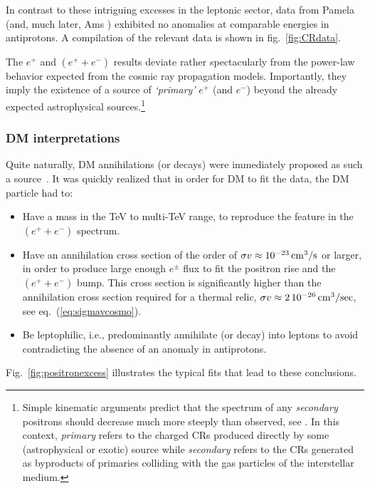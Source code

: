 In contrast to these intriguing excesses in the leptonic sector, data from {\sc Pamela} \cite{PAMELApbar} (and, much later, {\sc Ams} \cite{Aguilar:2016kjl}) exhibited no anomalies at comparable energies in antiprotons. A compilation  of the relevant data is shown in fig.~\ref{fig:CRdata}. 




\medskip

The $e^+$ and $(e^++e^-)$ results deviate rather spectacularly from the power-law behavior expected from the cosmic ray propagation models.  Importantly, they imply the existence of a source of {\em `primary'} $e^+$ (and $e^-$) beyond the already expected astrophysical sources.\footnote{Simple kinematic arguments predict that the spectrum of any {\em secondary} positrons should decrease  much more steeply than observed, see  \cite{positronexcessastro}. In this context, {\em primary} refers to the charged CRs produced directly by some (astrophysical or exotic) source while {\em secondary} refers to the CRs generated as byproducts of primaries colliding with the gas particles of the interstellar medium.} 


\subsubsection*{DM interpretations}
Quite naturally, DM annihilations (or decays) were immediately proposed as such a source~\cite{positronexcess}. 
It was quickly realized that in order for DM to fit the data, the DM particle had to: 
\begin{itemize}
\item[$\triangleright$] Have a mass in the TeV to multi-TeV range, to reproduce the feature in the $(e^++e^-)$ spectrum.
\item[$\triangleright$] Have an annihilation cross section of the order of $\sigma v\approx10^{-23}\, {\rm cm}^3/{\rm s}$ or larger, in order to produce large enough $e^\pm$ flux to fit the positron rise and the $(e^++e^-)$ bump.
This cross section is significantly higher than the annihilation cross section required for a thermal relic, $\sigma v \approx 2 \, 10^{-26}\, {\rm cm}^3/{\rm sec}$, see eq.~(\ref{eq:sigmavcosmo}). 
\item[$\triangleright$] Be leptophilic, i.e.,
predominantly annihilate (or decay) into leptons to avoid contradicting the absence of an anomaly in antiprotons.
\end{itemize} 
Fig.~\ref{fig:positronexcess} illustrates the typical fits that lead to these conclusions.



